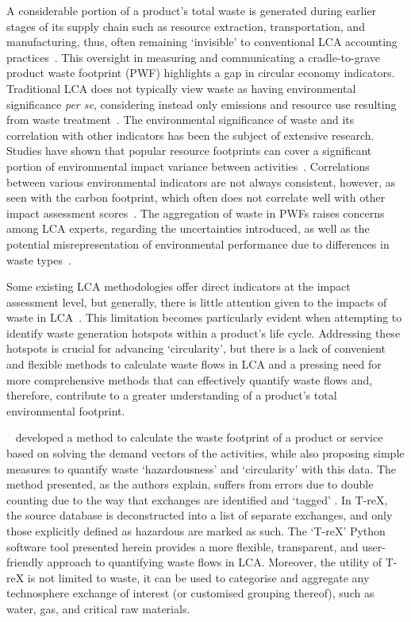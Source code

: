 \documentclass[a4paper,fleqn,longmktitle]{cas-dc}
\begin{document}
A considerable portion of a product's total waste is generated during earlier stages of its supply chain such as resource extraction, transportation, and manufacturing, thus, often remaining `invisible' to conventional LCA accounting practices~\citep{laurenti2016wastefootprint}. This oversight in measuring and communicating a cradle-to-grave product waste footprint (PWF) highlights a gap in circular economy indicators. Traditional LCA does not typically view waste as having environmental significance \textit{per se}, considering instead only emissions and resource use resulting from waste treatment~\citep{bisinella2024wastelca, laurenti2023wastefootprint}. The environmental significance of waste and its correlation with other indicators has been the subject of extensive research. Studies have shown that popular resource footprints can cover a significant portion of environmental impact variance between activities~\citep{steinmann2017resourcefootprints,laurenti2023wastefootprint}. Correlations between various environmental indicators are not always consistent, however, as seen with the carbon footprint, which often does not correlate well with other impact assessment scores~\citep{laurenti2012carbonfootprint}. The aggregation of waste in PWFs raises concerns among LCA experts, regarding the uncertainties introduced, as well as the potential misrepresentation of environmental performance due to differences in waste types~\citep{chen2021methoduncertainty,huijbregts2010energyfootprint}.

Some existing LCA methodologies offer direct indicators at the impact assessment level, but generally, there is little attention given to the impacts of waste in LCA~\citep{lauran2020abioticdepletion}. This limitation becomes particularly evident when attempting to identify waste generation hotspots within a product's life cycle. Addressing these hotspots is crucial for advancing `circularity', but there is a lack of convenient and flexible methods to calculate waste flows in LCA and a pressing need for more comprehensive methods that can effectively quantify waste flows and, therefore, contribute to a greater understanding of a product's total environmental footprint.

~\cite{laurenti2023wastefootprint} developed a method to calculate the waste footprint of a product or service based on solving the demand vectors of the activities, while also proposing simple measures to quantify waste `hazardousness' and `circularity' with this data. The method presented, as the authors explain, suffers from errors due to double counting due to the way that exchanges are identified and `tagged' . In T-reX, the source database is deconstructed into a list of separate exchanges, and only those explicitly defined as hazardous are marked as such. The `T-reX' Python software tool presented herein provides a more flexible, transparent, and user-friendly approach to quantifying waste flows in LCA\@. Moreover, the utility of T-reX is not limited to waste, it can be used to categorise and aggregate any technosphere exchange of interest (or customised grouping thereof), such as water, gas, and critical raw materials.
\end{document}
